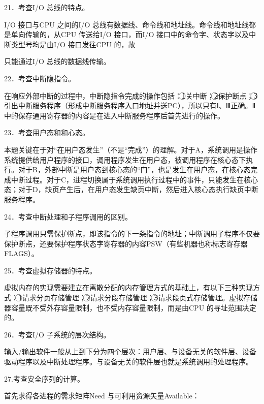\documentclass[UTF8,11pt]{ctexart}
\begin{document}
21．考查I/O 总线的特点。


I/O 接口与CPU 之间的I/O 总线有数据线、命令线和地址线。命令线和地址线都是单向传输的，从CPU 传送给I/O 接口，而I/O 接口中的命令字、状态字以及中断类型号均是由I/O 接口发往CPU 的，故


只能通过I/O 总线的数据线传输。


22．考查中断隐指令。


在响应外部中断的过程中，中断隐指令完成的操作包括：\textcircled{1}关中断；\textcircled{2}保护断点；\textcircled{3}引出中断服务程序（形成中断服务程序入口地址并送PC），所以只有Ⅰ、Ⅲ正确。Ⅱ中的保存通用寄存器的内容是在进入中断服务程序后首先进行的操作。


23．考查用户态和和心态。


本题关键在于对“在用户态发生”（不是“完成”）的理解。对于A，系统调用是操作系统提供给用户程序的接口，调用程序发生在用户态，被调用程序在核心态下执行。对于B，外部中断是用户态到核心态的“门”，也是发生在用户态，在核心态完成中断过程。对于C，进程切换属于系统调用执行过程中的事件，只能发生在核心态；对于D，缺页产生后，在用户态发生缺页中断，然后进入核心态执行缺页中断服务程序。


24．考查中断处理和子程序调用的区别。


子程序调用只需保护断点，即该指令的下一条指令的地址；中断调用子程序不仅要保护断点，还要保护程序状态字寄存器的内容PSW（有些机器也称标志寄存器FLAGS）。


25．考查虚拟存储器的特点。


虚拟内存的实现需要建立在离散分配的内存管理方式的基础上，有以下三种实现方式：\textcircled{1}请求分页存储管理；\textcircled{2}请求分段存储管理；\textcircled{3}请求段页式存储管理。虚拟存储器容量既不受外存容量限制，也不受内存容量限制，而是由CPU 的寻址范围决定的。


26．考查I/O 子系统的层次结构。


输入/输出软件一般从上到下分为四个层次：用户层、与设备无关的软件层、设备驱动程序以及中断处理程序。与设备无关的软件层也就是系统调用的处理程序。


27.考查安全序列的计算。


首先求得各进程的需求矩阵Need 与可利用资源矢量Available：
\end{document}

